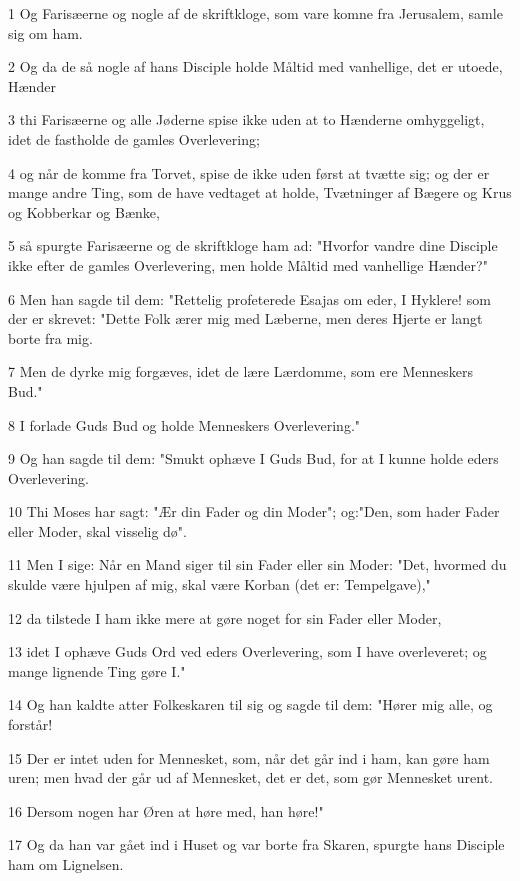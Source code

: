 \par 1 Og Farisæerne og nogle af de skriftkloge, som vare komne fra Jerusalem, samle sig om ham.
\par 2 Og da de så nogle af hans Disciple holde Måltid med vanhellige, det er utoede, Hænder
\par 3 thi Farisæerne og alle Jøderne spise ikke uden at to Hænderne omhyggeligt, idet de fastholde de gamles Overlevering;
\par 4 og når de komme fra Torvet, spise de ikke uden først at tvætte sig; og der er mange andre Ting, som de have vedtaget at holde, Tvætninger af Bægere og Krus og Kobberkar og Bænke,
\par 5 så spurgte Farisæerne og de skriftkloge ham ad: "Hvorfor vandre dine Disciple ikke efter de gamles Overlevering, men holde Måltid med vanhellige Hænder?"
\par 6 Men han sagde til dem: "Rettelig profeterede Esajas om eder, I Hyklere! som der er skrevet: "Dette Folk ærer mig med Læberne, men deres Hjerte er langt borte fra mig.
\par 7 Men de dyrke mig forgæves, idet de lære Lærdomme, som ere Menneskers Bud."
\par 8 I forlade Guds Bud og holde Menneskers Overlevering."
\par 9 Og han sagde til dem: "Smukt ophæve I Guds Bud, for at I kunne holde eders Overlevering.
\par 10 Thi Moses har sagt: "Ær din Fader og din Moder"; og:"Den, som hader Fader eller Moder, skal visselig dø".
\par 11 Men I sige: Når en Mand siger til sin Fader eller sin Moder: "Det, hvormed du skulde være hjulpen af mig, skal være Korban (det er: Tempelgave),"
\par 12 da tilstede I ham ikke mere at gøre noget for sin Fader eller Moder,
\par 13 idet I ophæve Guds Ord ved eders Overlevering, som I have overleveret; og mange lignende Ting gøre I."
\par 14 Og han kaldte atter Folkeskaren til sig og sagde til dem: "Hører mig alle, og forstår!
\par 15 Der er intet uden for Mennesket, som, når det går ind i ham, kan gøre ham uren; men hvad der går ud af Mennesket, det er det, som gør Mennesket urent.
\par 16 Dersom nogen har Øren at høre med, han høre!"
\par 17 Og da han var gået ind i Huset og var borte fra Skaren, spurgte hans Disciple ham om Lignelsen.
